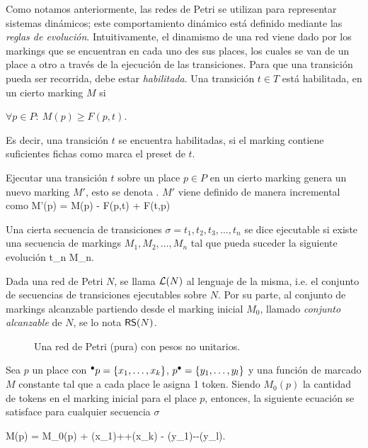 Como notamos anteriormente, las redes de Petri se utilizan para representar sistemas 
dinámicos; este comportamiento dinámico está definido mediante las \emph{reglas de evolución}.
Intuitivamente, el dinamismo de una red viene dado por los markings que se encuentran en cada
uno des sus places, los cuales se van  de un place a otro a través de la 
ejecución de las transiciones. 
Para que una transición pueda ser recorrida, debe estar \emph{habilitada}. Una transición 
$t \in T$ está habilitada, en un cierto marking $M$ si 

\bequation
    \mbox{$\forall p \in P:~ M(p) \ge F(p,t) $}.
\eequation

Es decir, una transición $t$ se encuentra habilitadas, si el marking contiene suficientes
fichas como marca el preset de $t$.

Ejecutar una transición $t$ sobre un place $p \in P$ en un cierto marking genera 
un nuevo marking $M'$, esto se denota .
$M'$ viene definido de manera incremental como
\bequation
    M'(p) = M(p) - F(p,t) +  F(t,p)
\eequation

Una cierta secuencia de transiciones \mbox{$\sigma = t_1,t_2, t_3, \ldots, t_n$}
se dice ejecutable si existe una secuencia de markings \mbox{$M_1, M_2, \ldots, M_n$}
tal que pueda suceder la siguiente evolución
\bequation
     {t_n} {M_n}.
\eequation

Dada una red de Petri $N$, se llama $\mathcal{L}(N)$ al lenguaje de la misma, i.e.
el conjunto de secuencias de transiciones ejecutables sobre $N$.
Por su parte, al conjunto de markings alcanzable partiendo desde el marking inicial $M_0$,
llamado \emph{conjunto alcanzable} de $N$, se lo nota $\textsf{RS}(N)$.

\begin{figure}[h]
  	\centering
    
    \caption{Una red de Petri (pura) con pesos no unitarios.}
    \label{fig:pn1}
\end{figure}

Sea $p$ un place con \mbox{$\mbox{$^\bullet p$}=\{x_1,\ldots,x_k\}$}, \mbox{$\mbox{$p^\bullet$}=\{y_1,\ldots,y_l\}$} 
y una función de marcado $M$ constante  tal que a cada place le asigna 1 token.
Siendo $M_0(p)$ la cantidad de tokens en el marking inicial 
para el place $p$, entonces, la siguiente ecuación
se satisface para cualquier secuencia $\sigma$

    M(p) = M_0(p) + \widehat\sigma(x_1)+\cdots +\widehat\sigma(x_k) - \widehat\sigma(y_1)-\cdots -\widehat\sigma(y_l).
\eequation

